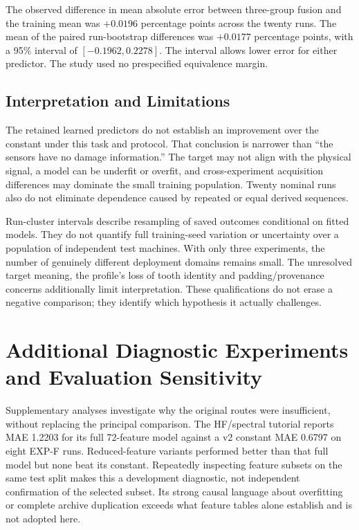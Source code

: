 The observed difference in mean absolute error between three-group fusion and the training mean was $+0.0196$ percentage points across the twenty runs. The mean of the paired run-bootstrap differences was $+0.0177$ percentage points, with a 95\% interval of $[-0.1962,0.2278]$. The interval allows lower error for either predictor. The study used no prespecified equivalence margin.

\subsection{Interpretation and Limitations}
The retained learned predictors do not establish an improvement over the constant under this task and protocol. That conclusion is narrower than ``the sensors have no damage information.'' The target may not align with the physical signal, a model can be underfit or overfit, and cross-experiment acquisition differences may dominate the small training population. Twenty nominal runs also do not eliminate dependence caused by repeated or equal derived sequences.

Run-cluster intervals describe resampling of saved outcomes conditional on fitted models. They do not quantify full training-seed variation or uncertainty over a population of independent test machines. With only three experiments, the number of genuinely different deployment domains remains small. The unresolved target meaning, the profile's loss of tooth identity and padding/provenance concerns additionally limit interpretation. These qualifications do not erase a negative comparison; they identify which hypothesis it actually challenges.

\section{Additional Diagnostic Experiments and Evaluation Sensitivity}
Supplementary analyses investigate why the original routes were insufficient, without replacing the principal comparison. The HF/spectral tutorial reports MAE 1.2203 for its full 72-feature model against a v2 constant MAE 0.6797 on eight EXP-F runs. Reduced-feature variants performed better than that full model but none beat its constant. Repeatedly inspecting feature subsets on the same test split makes this a development diagnostic, not independent confirmation of the selected subset. Its strong causal language about overfitting or complete archive duplication exceeds what feature tables alone establish and is not adopted here.

